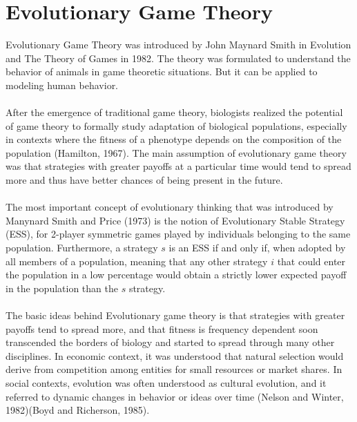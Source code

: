 \section{Evolutionary Game Theory}

Evolutionary Game Theory was introduced by John Maynard Smith in Evolution and The Theory of Games in 1982. The theory was formulated to understand the behavior of animals in game theoretic situations. But it can be applied to modeling human behavior.

\paragraph{}After the emergence of traditional game theory, biologists realized the potential of game theory to formally study adaptation of biological populations, especially in contexts where the fitness of a phenotype depends on the composition of the population (Hamilton, 1967). The main assumption of evolutionary game theory was that strategies with greater payoffs at a particular time would tend to spread more and thus have better chances of being present in the future.
\paragraph{}The most important concept of evolutionary thinking that was introduced by Manynard Smith and Price (1973) is the notion of Evolutionary Stable Strategy (ESS), for 2-player symmetric games played by individuals belonging to the same population. Furthermore, a strategy $s$ is an ESS if and only if, when adopted by all members of a population, meaning that any other strategy $i$ that could enter the population in a low percentage would obtain a strictly  lower expected payoff in the population than the $s$ strategy.
\paragraph{}The basic ideas behind Evolutionary game theory is that strategies with greater payoffs tend to spread more, and that fitness is frequency dependent soon transcended the borders of biology and started to spread through many other disciplines. In economic context, it was understood that natural selection would derive from competition among entities for small resources or market shares. In social contexts, evolution was often understood as cultural evolution, and it referred to dynamic changes in behavior or ideas over time (Nelson and Winter, 1982)(Boyd and Richerson, 1985).

